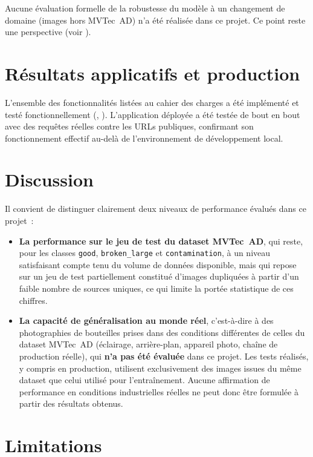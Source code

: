 Aucune \'evaluation formelle de la robustesse du mod\`ele \`a un changement de domaine (images hors MVTec~AD) n'a \'et\'e r\'ealis\'ee dans ce projet. Ce point reste une perspective (voir ).

\section{R\'esultats applicatifs et production}

L'ensemble des fonctionnalit\'es list\'ees au cahier des charges a \'et\'e impl\'ement\'e et test\'e fonctionnellement (, ). L'application d\'eploy\'ee a \'et\'e test\'ee de bout en bout avec des requ\^etes r\'eelles contre les URLs publiques, confirmant son fonctionnement effectif au-del\`a de l'environnement de d\'eveloppement local.

\section{Discussion}

Il convient de distinguer clairement deux niveaux de performance \'evalu\'es dans ce projet~:
\begin{itemize}
  \item \textbf{La performance sur le jeu de test du dataset MVTec~AD}, qui reste, pour les classes \texttt{good}, \texttt{broken\_large} et \texttt{contamination}, \`a un niveau satisfaisant compte tenu du volume de donn\'ees disponible, mais qui repose sur un jeu de test partiellement constitu\'e d'images dupliqu\'ees \`a partir d'un faible nombre de sources uniques, ce qui limite la port\'ee statistique de ces chiffres.
  \item \textbf{La capacit\'e de g\'en\'eralisation au monde r\'eel}, c'est-\`a-dire \`a des photographies de bouteilles prises dans des conditions diff\'erentes de celles du dataset MVTec~AD (\'eclairage, arri\`ere-plan, appareil photo, cha\^ine de production r\'eelle), qui \textbf{n'a pas \'et\'e \'evalu\'ee} dans ce projet. Les tests r\'ealis\'es, y compris en production, utilisent exclusivement des images issues du m\^eme dataset que celui utilis\'e pour l'entra\^inement. Aucune affirmation de performance en conditions industrielles r\'eelles ne peut donc \^etre formul\'ee \`a partir des r\'esultats obtenus.
\end{itemize}

\section{Limitations}

